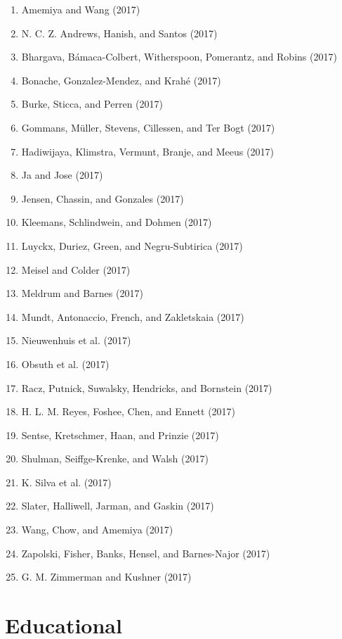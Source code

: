 \documentclass[english,man]{apa6}
\providecommand{\tightlist}{%
  \setlength{\itemsep}{0pt}\setlength{\parskip}{0pt}}
\theoremstyle{definition}
\theoremstyle{definition}
\theoremstyle{definition}
\theoremstyle{remark}
\begin{document}
\begin{enumerate}
\def\labelenumi{\arabic{enumi})}
\tightlist
\item
  Amemiya and Wang (2017)
\item
  N. C. Z. Andrews, Hanish, and Santos (2017)
\item
  Bhargava, Bámaca-Colbert, Witherspoon, Pomerantz, and Robins (2017)
\item
  Bonache, Gonzalez-Mendez, and Krahé (2017)
\item
  Burke, Sticca, and Perren (2017)
\item
  Gommans, Müller, Stevens, Cillessen, and Ter Bogt (2017)
\item
  Hadiwijaya, Klimstra, Vermunt, Branje, and Meeus (2017)
\item
  Ja and Jose (2017)
\item
  Jensen, Chassin, and Gonzales (2017)
\item
  Kleemans, Schlindwein, and Dohmen (2017)
\item
  Luyckx, Duriez, Green, and Negru-Subtirica (2017)
\item
  Meisel and Colder (2017)
\item
  Meldrum and Barnes (2017)
\item
  Mundt, Antonaccio, French, and Zakletskaia (2017)
\item
  Nieuwenhuis et al. (2017)
\item
  Obsuth et al. (2017)
\item
  Racz, Putnick, Suwalsky, Hendricks, and Bornstein (2017)
\item
  H. L. M. Reyes, Foshee, Chen, and Ennett (2017)
\item
  Sentse, Kretschmer, Haan, and Prinzie (2017)
\item
  Shulman, Seiffge-Krenke, and Walsh (2017)
\item
  K. Silva et al. (2017)
\item
  Slater, Halliwell, Jarman, and Gaskin (2017)
\item
  Wang, Chow, and Amemiya (2017)
\item
  Zapolski, Fisher, Banks, Hensel, and Barnes-Najor (2017)
\item
  G. M. Zimmerman and Kushner (2017)
\end{enumerate}

\section{Educational}\label{educational}
\end{document}
